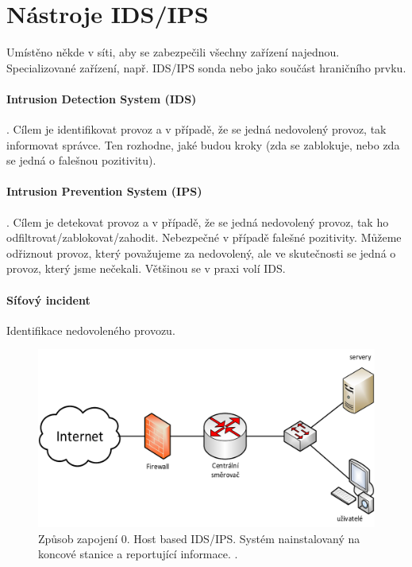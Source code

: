 \section{Nástroje IDS/IPS}

Umístěno někde v síti, aby se zabezpečili všechny zařízení najednou. Specializované zařízení, např. IDS/IPS sonda nebo jako součást hraničního prvku.

\paragraph*{Intrusion Detection System (IDS)} . Cílem je identifikovat provoz a v případě, že se jedná nedovolený provoz, tak informovat správce. Ten rozhodne, jaké budou kroky (zda se zablokuje, nebo zda se jedná o falešnou pozitivitu).

\paragraph*{Intrusion Prevention System (IPS)} . Cílem je detekovat provoz a v případě, že se jedná nedovolený provoz, tak ho odfiltrovat/zablokovat/zahodit. Nebezpečné v případě falešné pozitivity. Můžeme odřiznout provoz, který považujeme za nedovolený, ale ve skutečnosti se jedná o provoz, který jsme nečekali. Většinou se v praxi volí IDS.

\paragraph*{Síťový incident} Identifikace nedovoleného provozu.

\begin{figure}[H]
    \centering
    \includegraphics[width=0.75\linewidth]{zpusob_zapojeni_0.png}
    \caption{Způsob zapojení 0. Host based IDS/IPS. Systém nainstalovaný na koncové stanice a reportující informace. .}
\end{figure}


